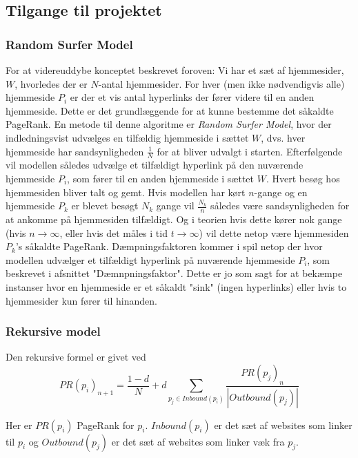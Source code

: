 \subsection{Tilgange til projektet}

\subsubsection{Random Surfer Model}


For at videreuddybe konceptet beskrevet foroven: Vi har et sæt af hjemmesider, $W$, hvorledes der er $N$-antal hjemmesider. For hver (men ikke nødvendigvis alle) hjemmeside $P_i$ er der et vis antal hyperlinks der fører videre til en anden hjemmeside. Dette er det grundlæggende for at kunne bestemme det såkaldte PageRank. En metode til denne algoritme er \emph{Random Surfer Model}, hvor der indledningsvist udvælges en tilfældig hjemmeside i sættet $W$, dvs. hver hjemmeside har sandsynligheden $\frac{1}{N}$ for at bliver udvalgt i starten. Efterfølgende vil modellen således udvælge et tilfældigt hyperlink på den nuværende hjemmeside $P_i$, som fører til en anden hjemmeside i sættet $W$. Hvert besøg hos hjemmesiden bliver talt og gemt. Hvis modellen har kørt $n$-gange og en hjemmeside $P_k$ er blevet besøgt $N_k$ gange vil $\frac{N_k}{n}$ således være sandsynligheden for at ankomme på hjemmesiden tilfældigt. Og i teorien hvis dette kører nok gange (hvis $n \rightarrow \infty$, eller hvis det måles i tid $t \rightarrow \infty$) vil dette netop være hjemmesiden $P_k$'s såkaldte PageRank. Dæmpningsfaktoren kommer i spil netop der hvor modellen udvælger et tilfældigt hyperlink på nuværende hjemmeside $P_i$, som beskrevet i afsnittet "Dæmnpningsfaktor". Dette er jo som sagt for at bekæmpe instanser hvor en hjemmeside er et såkaldt "sink" (ingen hyperlinks) eller hvis to hjemmesider kun fører til hinanden.


\subsubsection{Rekursive model}

Den rekursive formel er givet ved
\begin{equation} \label{udgangspunkt}
    PR(p_i)_{n+1}=\frac{1-d}N+d\sum_{p_j\in Inbound(p_i)}\frac{PR(p_j)_n}{\left|Outbound(p_j)\right|}
\end{equation}

Her er $PR(p_i)$ PageRank for $p_i$. $Inbound(p_i)$ er det sæt af websites som linker til $p_i$ og $Outbound(p_j)$ er det sæt af websites som linker væk fra $p_j$.

